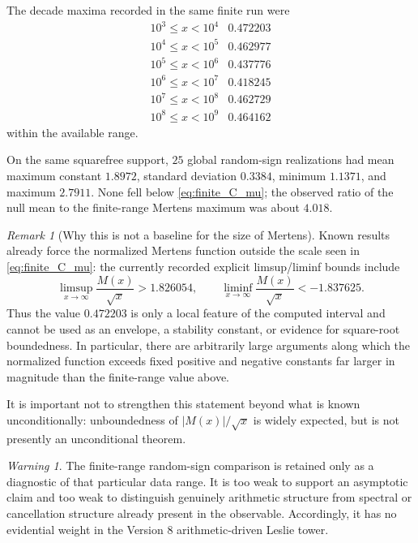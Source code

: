 \documentclass[11pt]{amsart}
\numberwithin{equation}{section}
\theoremstyle{plain}
\theoremstyle{definition}
\theoremstyle{remark}
\newtheorem{remark}[theorem]{Remark}
\newtheorem{warning}[theorem]{Warning}
\begin{document}
The decade maxima recorded in the same finite run were
\[
\begin{array}{c|c}
10^3\le x<10^4 & 0.472203\\
10^4\le x<10^5 & 0.462977\\
10^5\le x<10^6 & 0.437776\\
10^6\le x<10^7 & 0.418245\\
10^7\le x<10^8 & 0.462729\\
10^8\le x<10^9 & 0.464162
\end{array}
\]
within the available range.

On the same squarefree support, $25$ global random-sign realizations had mean maximum constant
$1.8972$, standard deviation $0.3384$, minimum $1.1371$, and maximum $2.7911$.
None fell below \eqref{eq:finite_C_mu}; the observed ratio of the null mean to the finite-range
Mertens maximum was about $4.018$.

\begin{remark}[Why this is not a baseline for the size of Mertens]
\label{rem:finite_range_not_baseline}
Known results already force the normalized Mertens function outside the scale seen in
\eqref{eq:finite_C_mu}: the currently recorded explicit limsup/liminf bounds include
\[
\limsup_{x\to\infty}\frac{M(x)}{\sqrt{x}}>1.826054,
\qquad
\liminf_{x\to\infty}\frac{M(x)}{\sqrt{x}}<-1.837625.
\]
Thus the value $0.472203$ is only a local feature of the computed interval and cannot be used as
an envelope, a stability constant, or evidence for square-root boundedness.  In particular,
there are arbitrarily large arguments along which the normalized function exceeds fixed positive
and negative constants far larger in magnitude than the finite-range value above.

It is important not to strengthen this statement beyond what is known unconditionally:
unboundedness of $|M(x)|/\sqrt{x}$ is widely expected, but is not presently an unconditional
theorem.
\end{remark}

\begin{warning}
\label{warn:finite_not_asymptotic}
The finite-range random-sign comparison is retained only as a diagnostic of that particular data
range.  It is too weak to support an asymptotic claim and too weak to distinguish genuinely
arithmetic structure from spectral or cancellation structure already present in the observable.
Accordingly, it has no evidential weight in the Version 8 arithmetic-driven Leslie tower.
\end{warning}
\end{document}
